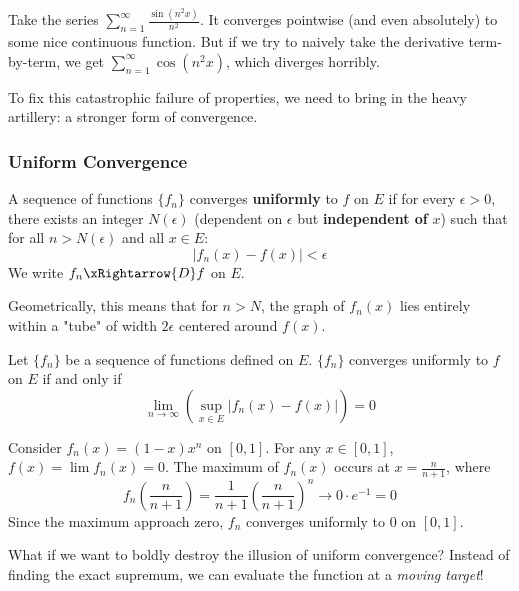 \begin{example}
Take the series $\sum_{n=1}^{\infty} \frac{\sin(n^2 x)}{n^2}$. It converges pointwise (and even absolutely) to some nice continuous function. But if we try to naively take the derivative term-by-term, we get $\sum_{n=1}^{\infty} \cos(n^2 x)$, which diverges horribly. 
\end{example}

To fix this catastrophic failure of properties, we need to bring in the heavy artillery: a stronger form of convergence.

\subsubsection{Uniform Convergence}

\begin{definition}
A sequence of functions $\{f_n\}$ converges \textbf{uniformly} to $f$ on $E$ if for every $\epsilon > 0$, there exists an integer $N(\epsilon)$ (dependent on $\epsilon$ but \textbf{independent of} $x$) such that for all $n > N(\epsilon)$ and all $x \in E$:
\[ |f_n(x) - f(x)| < \epsilon \]
We write $f_n \xRightarrow{D} f$ on $E$.
\end{definition}

Geometrically, this means that for $n > N$, the graph of $f_n(x)$ lies entirely within a "tube" of width $2\epsilon$ centered around $f(x)$.

\begin{theorem}
Let $\{f_n\}$ be a sequence of functions defined on $E$. $\{f_n\}$ converges uniformly to $f$ on $E$ if and only if
\[ \lim_{n \to \infty} \left( \sup_{x \in E} |f_n(x) - f(x)| \right) = 0 \]
\end{theorem}

\begin{example}
Consider $f_n(x) = (1-x)x^n$ on $[0,1]$. For any $x \in [0,1]$, $f(x) = \lim f_n(x) = 0$.
The maximum of $f_n(x)$ occurs at $x = \frac{n}{n+1}$, where
\[ f_n\left(\frac{n}{n+1}\right) = \frac{1}{n+1} \left(\frac{n}{n+1}\right)^n \to 0 \cdot e^{-1} = 0 \]
Since the maximum approach zero, $f_n$ converges uniformly to $0$ on $[0,1]$.
\end{example}

What if we want to boldly destroy the illusion of uniform convergence? Instead of finding the exact supremum, we can evaluate the function at a \textit{moving target}!


